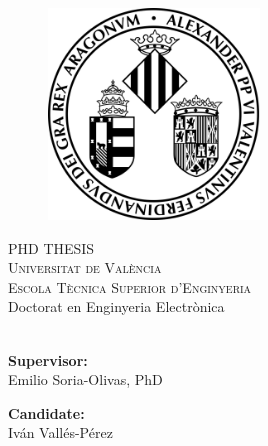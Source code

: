 \makeatletter
\begin{titlepage}
	\begin{figure}[t]
		\centering\includegraphics[width=0.5\textwidth]{titlepage/images/logo}
	\end{figure}
	\begin{center}
		\large{\textsc{PHD THESIS}} \\
		\textsc{ \LARGE{Universitat de València \\}}
		\textsc{ \LARGE{Escola Tècnica Superior d'Enginyeria\\ }}
		\textnormal{ \LARGE{Doctorat en Enginyeria Electrònica\\}}
		\vspace{30mm}
		\fontsize{10mm}{7mm}\selectfont 
		\LARGE{\@title}\\

	\end{center}
	
	\vspace{25mm}
	
	\begin{minipage}[t]{0.47\textwidth}
		\textnormal{\large{\bf Supervisor:\\}}
		{\large Emilio Soria-Olivas, PhD}
	\end{minipage}\hfill\begin{minipage}[t]{0.47\textwidth}\raggedleft
		\textnormal{\large{\bf Candidate:\\}}
		{\large Iván Vallés-Pérez}
	\end{minipage}
	
	\vspace{20mm}
	
	
\end{titlepage}
\makeatother
